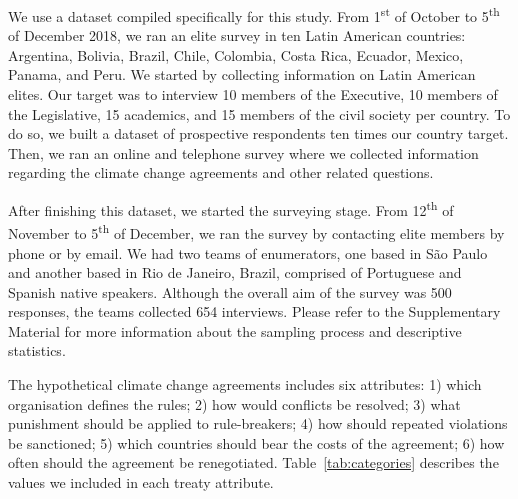 \documentclass[a4paper,12pt]{article}
\begin{document}
We use a dataset compiled specifically for this study. From 1\textsuperscript{st} of October to 5\textsuperscript{th} of December 2018, we ran an elite survey in ten Latin American countries: Argentina, Bolivia, Brazil, Chile, Colombia, Costa Rica, Ecuador, Mexico, Panama, and Peru. We started by collecting information on Latin American elites. Our target was to interview 10 members of the Executive, 10 members of the Legislative, 15 academics, and 15 members of the civil society per country. To do so, we built a dataset of prospective respondents ten times our country target. Then, we ran an online and telephone survey where we collected information regarding the climate change agreements and other related questions.

After finishing this dataset, we started the surveying stage. From 12\textsuperscript{th} of November to 5\textsuperscript{th} of December, we ran the survey by contacting elite members by phone or by email. We had two teams of enumerators, one based in S\~{a}o Paulo and another based in Rio de Janeiro, Brazil, comprised of Portuguese and Spanish native speakers. Although the overall aim of the survey was 500 responses, the teams collected 654 interviews. Please refer to the Supplementary Material for more information about the sampling process and descriptive statistics.

The hypothetical climate change agreements includes six attributes: 1) which organisation defines the rules; 2) how would conflicts be resolved; 3) what punishment should be applied to rule-breakers; 4) how should repeated violations be sanctioned; 5) which countries should bear the costs of the agreement; 6) how often should the agreement be renegotiated. Table~\ref{tab:categories} describes the values we included in each treaty attribute. \\

\newpage 
\end{document}
